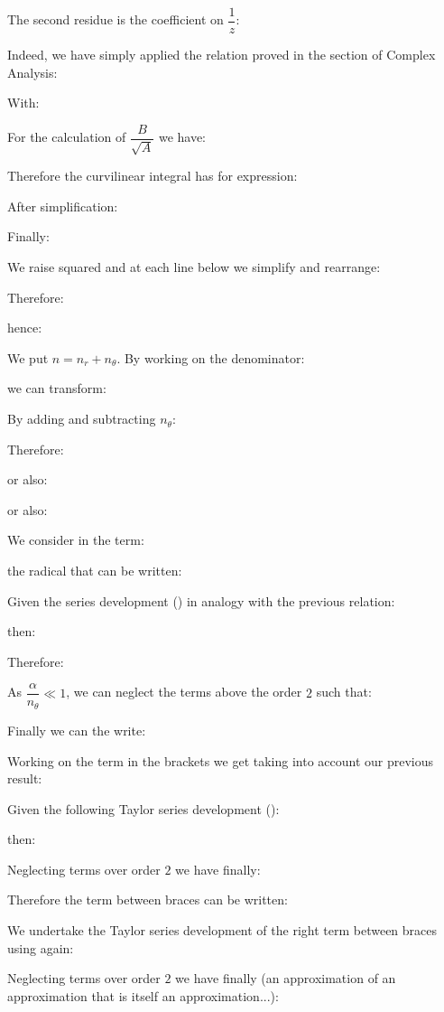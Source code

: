 	The second residue is the coefficient on $\dfrac{1}{z}$:
	
	Indeed, we have simply applied the relation proved in the section of Complex Analysis:
	
	
	With:
	
	For the calculation of $\dfrac{B}{\sqrt{A}}$ we have:
	
		Therefore the curvilinear integral has for expression:
	
	After simplification:
	
	Finally:
	
	We raise squared and at each line below we simplify and rearrange:
	
	Therefore:
	
	hence:
	
	We put $n=n_r+n_\theta$. By working on the denominator:
	
	we can transform:
	
	By adding and subtracting $n_\theta$:
	
	Therefore:
	
	or also:
	
	or also:
	
	We consider in the term:
	
	the radical that can be written:
	
	Given the series development () in analogy with the previous relation:
	
	then:
	
	Therefore:
	
	As $\dfrac{\alpha}{n_\theta} \ll 1$, we can neglect the terms above the order $2$ such that:
	
	Finally we can the write:
	
	Working on the term in the brackets we get taking into account our previous result:
	
	Given the following Taylor series development ():
	
	then:
	
	Neglecting terms over order $2$ we have finally:
	
	Therefore the term between braces can be written:
	
	We undertake the Taylor series development of the right term between braces using again:
	
	Neglecting terms over order $2$ we have finally (an approximation of an approximation that is itself an approximation...):
	
